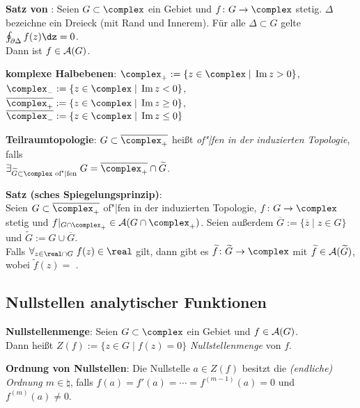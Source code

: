 \linie

\textbf{Satz von }:
Seien $G \subset \complex$ ein Gebiet und $f\colon G \rightarrow \complex$
stetig.
$\Delta$ bezeichne ein Dreieck (mit Rand und Innerem).
Für alle $\Delta \subset G$ gelte $\oint_{\partial\Delta} f(z)\dz = 0$.\\
Dann ist $f \in \mathcal{A}(G)$.

\textbf{komplexe Halbebenen}:
$\complex_+ := \{z \in \complex \;|\; \Im z > 0\}$,
$\complex_- := \{z \in \complex \;|\; \Im z < 0\}$,\\
$\overline{\complex_+} := \{z \in \complex \;|\; \Im z \ge 0\}$,
$\overline{\complex_-} := \{z \in \complex \;|\; \Im z \le 0\}$

\textbf{Teilraumtopologie}:
$G \subset \overline{\complex_+}$ heißt
\emph{of"|fen in der induzierten Topologie}, falls\\
$\exists_{\widetilde{G} \subset \complex \text{ of"|fen}}\;
G = \overline{\complex_+} \cap \widetilde{G}$.

\textbf{Satz (sches Spiegelungsprinzip)}:\\
Seien $G \subset \overline{\complex_+}$ of"|fen in der induzierten Topologie,
$f \colon G \rightarrow \complex$ stetig und
$f|_{G \cap \complex_+} \in \A(G \cap \complex_+)$.
Seien außerdem $\overline{G} := \{\overline{z} \;|\; z \in G\}$
und $\widetilde{G} := G \cup \overline{G}$.\\
Falls $\forall_{z \in \real \cap G}\; f(z) \in \real$ gilt, dann gibt es
$\widetilde{f}\colon \widetilde{G} \rightarrow \complex$ mit
$\widetilde{f} \in \mathcal{A}(\widetilde{G})$, wobei
$\widetilde{f}(z) =$ .

\subsection{%
    Nullstellen analytischer Funktionen%
}

\textbf{Nullstellenmenge}:
Seien $G \subset \complex$ ein Gebiet und $f \in \mathcal{A}(G)$.\\
Dann heißt $Z(f) := \{z \in G \;|\; f(z) = 0\}$
\emph{Nullstellenmenge} von $f$.

\textbf{Ordnung von Nullstellen}:
Die Nullstelle $a \in Z(f)$ besitzt die
\emph{(endliche) Ordnung $m \in \natural$}, falls
$f(a) = f'(a) = \dotsb = f^{(m-1)}(a) = 0$ und
$f^{(m)}(a) \not= 0$.

